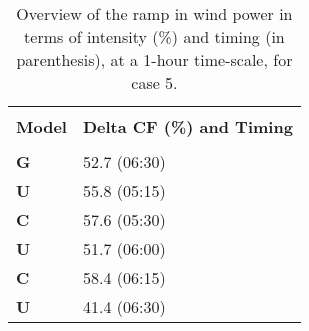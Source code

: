 
\begin{table}[htpb]
    \caption{Overview of the ramp in wind power in terms of intensity (\%) and timing (in parenthesis), at a 1-hour time-scale, for case 5.}
    \centering
    \begin{tabular}{l|p{3cm}}
        \hline \\
        \textbf{Model} & \textbf{Delta CF (\%) and Timing} \\
        \hline \\
            \textbf{G} & 52.7 (06:30) \\
        \textbf{U} & 55.8 (05:15) \\
        \textbf{C} & 57.6 (05:30) \\
        \textbf{U} & 51.7 (06:00) \\
        \textbf{C} & 58.4 (06:15) \\
        \textbf{U} & 41.4 (06:30) \\

        \hline
    \end{tabular}
    \label{ramp_in_capacity_factor_combined_case_5}
\end{table}
